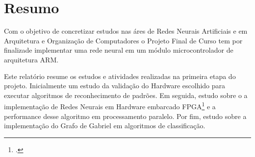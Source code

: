 \section*{Resumo}


Com o objetivo de concretizar estudos nas áres de Redes Neurais Artificiais e
em Arquitetura e Organização de Computadores o Projeto Final de Curso tem por finalizade
implementar uma rede neural em um módulo microcontrolador de arquitetura ARM.

Este relatório resume os estudos e atividades realizadas na primeira etapa do projeto.
Inicialmente um estudo da validação do Hardware escolhido para executar algoritmos de reconhecimento
de padrões. Em seguida, estudo sobre o a implementação de Redes Neurais em Hardware embarcado FPGA\footcite{FPGA: field programmable gate array}
e a performance desse algoritmo em processamento paralelo. Por fim, estudo sobre a implementação do Grafo de Gabriel 
em algoritmos de classificação. 



